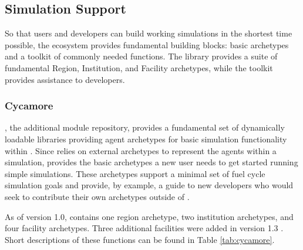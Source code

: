\subsection{Simulation Support}
So that users and developers can build working simulations in the shortest time
possible, the \Cyclus ecosystem provides fundamental building blocks: basic
archetypes and a toolkit of commonly needed functions.  The \Cycamore library
provides a suite of fundamental Region, Institution, and Facility archetypes,
while the \Cyclus toolkit provides assistance to developers.

\subsubsection{Cycamore}

\Cycamore \cite{carlsen_cycamore_2014}, the \Cyclus additional module
repository, provides a fundamental set of dynamically loadable libraries
providing agent archetypes for basic simulation
functionality within \Cyclus.  Since \Cyclus relies on external
archetypes to represent the agents within a simulation, \Cycamore provides the
basic archetypes a new user needs to get started running simple simulations.
These archetypes support a minimal set of fuel cycle simulation goals and
provide, by example, a guide to new developers who would seek to contribute
their own archetypes outside of \Cycamore.

As of version 1.0, \Cycamore contains one region archetype, two institution
archetypes, and four facility archetypes. Three additional facilities were
added in version 1.3 . Short descriptions of these functions can be found in
Table \ref{tab:cycamore}.

